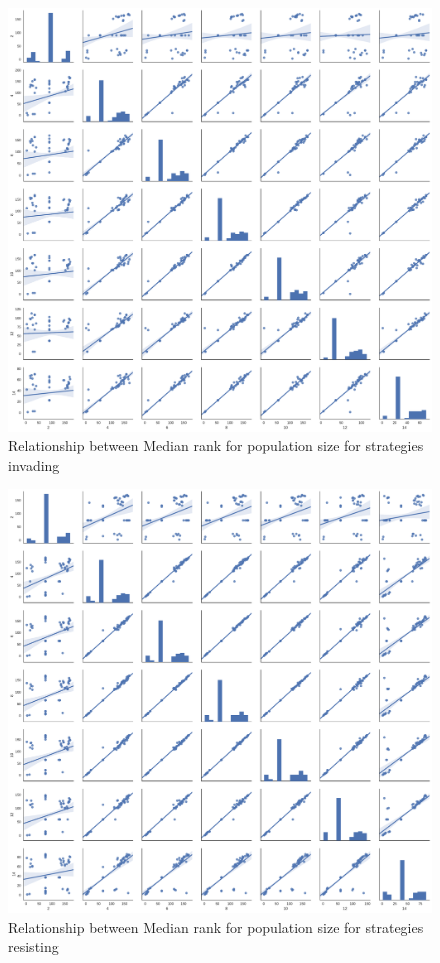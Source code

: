 \documentclass{article}
\begin{document}
\begin{figure}[!hbtp]
    \centering
    \includegraphics[width=\textwidth]{../img/relationship_between_median_ranks_invade.pdf}
    \caption{Relationship between Median rank for population size for strategies
    invading}
    \label{fig:relationship_ranks_v_size_invasion}
\end{figure}

\begin{figure}[!hbtp]
    \centering
    \includegraphics[width=\textwidth]{../img/relationship_between_median_ranks_resist.pdf}
    \caption{Relationship between Median rank for population size for strategies
    resisting}
    \label{fig:relationship_ranks_v_size_resistance}
\end{figure}
\end{document}
